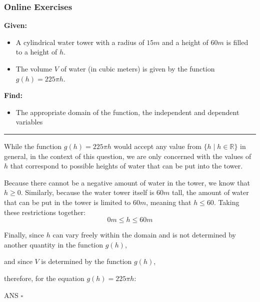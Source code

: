 \subsubsection{Online Exercises}

\begin{exercise}
    \textbf{Given:}
    \begin{itemize}
        \item A cylindrical water tower with a radius of $15m$ and a height of $60m$ is filled to a height of $h$.
        \item The volume $V$ of water​ (in cubic​ meters) is given by the function​ $g(h) = 225\pi h$.
    \end{itemize}

    \textbf{Find:}
    \begin{itemize}
        \item The appropriate domain of the function, the independent and dependent variables
    \end{itemize}
\end{exercise}
\rule{\textwidth}{0.4pt}

\begin{solution}
    While the function $g(h) = 225\pi h$ would accept any value from $\{ h \mid h \in \mathbb{R}\}$ in general,
    in the context of this question, we are only concerned with the values of $h$ that correspond to possible
    heights of water that can be put into the tower.
    
    Because there cannot be a negative amount of water in the tower, we know that $h \geq 0$.
    Similarly, because the water tower itself is $60m$ tall, the amount of water that can be put in the tower
    is limited to $60m$, meaning that $h \leq 60$.
    Taking these restrictions together: $$0m \leq h \leq 60m$$

    Finally, since $h$ can vary freely within the domain and is not determined by another quantity in the function $g(h)$,

    and since $V$ is determined by the function $g(h)$,
    
    therefore, for the equation $g(h) = 225\pi h$:


    \hfill ANS $\square$
\end{solution}


